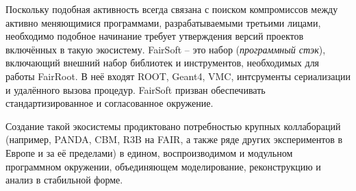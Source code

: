 Поскольку подобная активность всегда связана с поиском компромиссов
между активно меняющимися программами, разрабатываемыми третьими
лицами, необходимо подобное начинание требует утверждения версий
проектов включённых в такую экосистему. FairSoft -- это набор
(\emph{программный стэк}), включающий внешний набор библиотек и
инструментов, необходимых для работы FairRoot. В неё входят
ROOT, Geant4, VMC, интсрументы сериализации и удалённого вызова
процедур. FairSoft призван обеспечивать стандартизированное
и согласованное окружение.

Создание такой экосистемы продиктовано потребностью
крупных коллабораций (например, PANDA, CBM, R3B на FAIR,
а также ряде других экспериментов в Европе и за её пределами)
в едином, воспроизводимом и модульном программном окружении,
объединяющем моделирование, реконструкцию и анализ в стабильной
форме.
